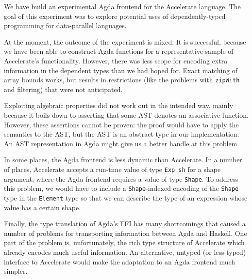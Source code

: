 \documentclass{llncs}
\begin{document}
We have build an experimental Agda frontend for the Accelerate
language. The goal of this experiment was to explore potential uses of
dependently-typed programming for data-parallel languages. 

At the moment, the outcome of the experiment is mixed. It is
successful, because we have been able to construct Agda functions for
a representative sample of Accelerate's functionality.
However, there was less scope for encoding extra information in the
dependent types than we had hoped for. Exact matching of array bounds
works, but results in restrictions (like the problems with
\texttt{zipWith} and filtering) that were not anticipated.

Exploiting algebraic properties did not work out in the intended way, mainly
because it boils down to asserting that some AST denotes an
associative function. However, these assertions cannot be proven: the
proof would have to apply the semantics to the AST, but the AST is an
abstract type in our implementation. An AST representation in Agda
might give us a better handle at this problem. 

In some places, the Agda frontend is less dynamic than Accelerate. In
a number of places, Accelerate accepts a run-time value of type
\texttt{Exp sh} for a shape argument, where the Agda frontend requires
a value of type \texttt{Shape}. To address this problem, we would have
to include a \texttt{Shape}-indexed encoding of the \texttt{Shape}
type in the \texttt{Element} type so that we can describe the type of
an expression whose value has a certain shape. 

Finally, the type translation of Agda's FFI has many shortcomings that
caused a number of problems for transporting information between Agda
and Haskell. One part of the problem is, unfortunately, the rich type
structure of Accelerate which already encodes much useful
information. An alternative, untyped (or less-typed) interface to
Accelerate would make the adaptation to an Agda frontend much simpler.

%
%


\end{document}
